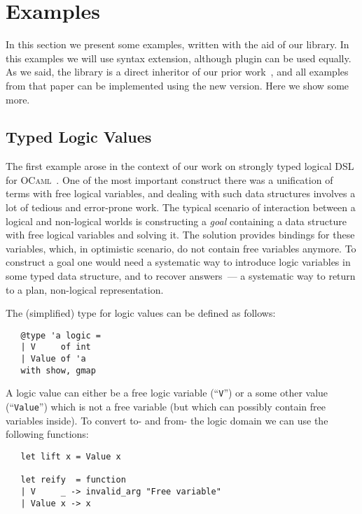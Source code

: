 \section{Examples}
\label{sec:examples}

In this section we present some examples, written with the aid of our library. In this examples we will use  syntax extension,
although  plugin can be used equally. As we said, the library is a direct inheritor of our prior work~\cite{TransformationObjects}, and
all examples from that paper can be implemented using the new version. Here we show some more.

\subsection{Typed Logic Values}

The first example arose in the context of our work on strongly typed logical DSL for \textsc{OCaml}~\cite{OCanren}. One of the
most important construct there was a unification of terms with free logical variables, and dealing with such data structures
involves a lot of tedious and error-prone work. The typical scenario of interaction between a logical and non-logical worlds
is constructing a \emph{goal} containing a data structure with free logical variables and solving it. The solution
provides bindings for these variables, which, in optimistic scenario, do not contain free variables anymore. To construct
a goal one would need a systematic way to introduce logic variables in some typed data structure, and to recover answers~---
a systematic way to return to a plan, non-logical representation.

The (simplified) type for logic values can be defined as follows:

\begin{lstlisting}
   @type 'a logic =
   | V     of int
   | Value of 'a
   with show, gmap
\end{lstlisting}

A logic value can either be a free logic variable (``\lstinline{V}'') or a some other value (``\lstinline{Value}'') which is not
a free variable (but which can possibly contain free variables inside). To convert to- and from- the logic domain we can use the following
functions:

\begin{lstlisting}
   let lift x = Value x
  
   let reify  = function
   | V     _ -> invalid_arg "Free variable"
   | Value x -> x
\end{lstlisting}

